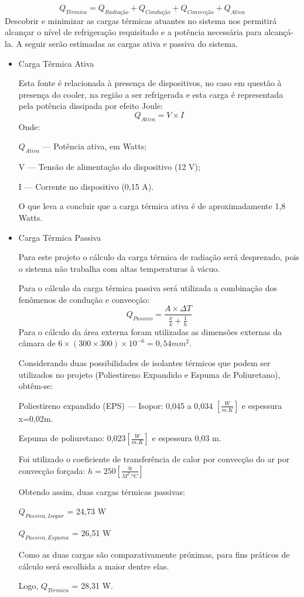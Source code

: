\begin{equation}
Q_{Térmica} = Q_{Radiação}+Q_{Condução}+Q_{Convecção}+Q_{Ativa}
\end{equation}
Descobrir e minimizar as cargas térmicas atuantes no sistema nos permitirá alcançar o nível de refrigeração requisitado e a potência necessária para alcançá-la. A seguir serão estimadas as cargas ativa e passiva do sistema.
\begin{itemize}
\item Carga Térmica Ativa

Esta  fonte é relacionada à presença de dispositivos, no caso em questão à presença do cooler, na região a ser refrigerada e esta carga é representada pela potência dissipada por efeito Joule:
\begin{equation}
Q_{Ativa} = V \times I
\end{equation}
Onde:

$Q_{Ativa}$ --- Potência ativa, em Watts;

V --- Tensão de alimentação do dispositivo (12 V);


I --- Corrente no dispositivo (0,15 A).

O que leva a concluir que a carga térmica ativa é de aproximadamente 1,8 Watts.

\item Carga Térmica Passiva

Para este projeto o cálculo da carga térmica de radiação será desprezado, pois o sistema não trabalha com altas temperaturas à vácuo.

Para o cálculo da carga térmica passiva será utilizada a combinação dos fenômenos de condução e convecção:
\begin{equation}
	Q_{Passivo}= \frac{A \times \Delta T}{\frac{x}{k} + \frac{1}{h}}
\end{equation}
Para o cálculo da área externa foram utilizadas as dimensões externas da câmara de $6\times(300 \times 300)\times 10^{-6}=0,54mm^2$. 

Considerando duas possibilidades de isolantes térmicos que podem ser utilizados no projeto (Poliestireno Expandido e Espuma de Poliuretano), obtêm-se:

Poliestireno expandido (EPS) --- Isopor: 0,045 a 0,034 $\left[\frac{W}{m.K}\right]$ e espessura x=0,02m.

Espuma de poliuretano: 0,023$\left[\frac{W}{m.K}\right]$ e espessura 0,03 m.

Foi utilizado o coeficiente de transferência de calor por convecção do ar por convecção forçada: $h = 250 \left[\frac{@}{M^2.ºC}\right] $

Obtendo assim, duas cargas térmicas passivas:

$Q_{Passiva, Isopor}$ = 24,73 W

$Q_{Passiva, Espuma} $ = 26,51 W

Como as duas cargas são comparativamente próximas, para fins práticos de cálculo será escolhida a maior dentre elas.

Logo, $Q_{Térmica}$ = 28,31 W.

\end{itemize}

